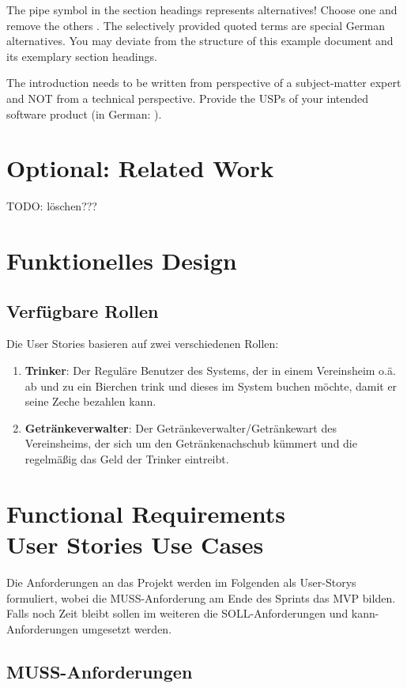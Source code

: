 \documentclass[conference,a4paper]{cs-techrep}
\begin{document}
The pipe symbol \textquote{\textbar{}} in the section headings represents alternatives! Choose one and remove the others \faWarning{}. The selectively provided quoted terms are special German alternatives. You may deviate from the structure of this example document and its exemplary section headings.

The introduction needs to be written from perspective of a subject-matter expert \faWarning{} and NOT from a technical perspective. Provide the USPs of your intended software product (in German: ).

\section{Optional: Related Work}
TODO: löschen???

\section{Funktionelles Design}
\subsection{Verfügbare Rollen}
Die User Stories basieren auf zwei verschiedenen Rollen:
\begin{enumerate}
\item \textbf{Trinker}: 
Der Reguläre Benutzer des Systems, der in einem Vereinsheim o.ä. ab und zu ein Bierchen trink und dieses im System buchen möchte, damit er seine Zeche bezahlen kann.
\item \textbf{Getränkeverwalter}: 
Der Getränkeverwalter/Getränkewart des Vereinsheims, der sich um den Getränkenachschub kümmert und die regelmäßig das Geld der Trinker eintreibt.
\end{enumerate}

\section{Functional Requirements \textbar{}\\User Stories \textbar{} Use Cases}

Die Anforderungen an das Projekt werden im Folgenden als User-Storys formuliert, wobei die MUSS-Anforderung am Ende des Sprints das MVP bilden. Falls noch Zeit bleibt sollen im weiteren die SOLL-Anforderungen und kann-Anforderungen umgesetzt werden.

\subsection{MUSS-Anforderungen}
\end{document}
